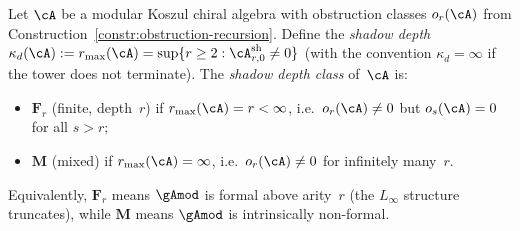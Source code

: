 \begin{definition}
\label{def:shadow-depth-classification}
\ClaimStatusProvedHere
{}
Let $\cA$ be a modular Koszul chiral algebra with
obstruction classes $o_r(\cA)$ from
Construction~\ref{constr:obstruction-recursion}.
Define the \emph{shadow depth}
$\kappa_d(\cA) := r_{\max}(\cA) =
\sup\{r \geq 2 : \cA^{\mathrm{sh}}_{r,0} \neq 0\}$
(with the convention $\kappa_d = \infty$ if the tower
does not terminate).
The \emph{shadow depth class} of~$\cA$ is:
\begin{itemize}[nosep]
\item $\mathbf{F}_r$ (finite, depth~$r$) if
  $r_{\max}(\cA) = r < \infty$, i.e.\
  $o_{r}(\cA) \neq 0$ but $o_{s}(\cA) = 0$ for all $s > r$;
\item $\mathbf{M}$ (mixed) if
  $r_{\max}(\cA) = \infty$, i.e.\
  $o_r(\cA) \neq 0$ for infinitely many~$r$.
\end{itemize}
Equivalently, $\mathbf{F}_r$ means $\gAmod$ is formal above
arity~$r$ (the $L_\infty$ structure truncates), while
$\mathbf{M}$ means $\gAmod$ is intrinsically non-formal.


\end{definition}
